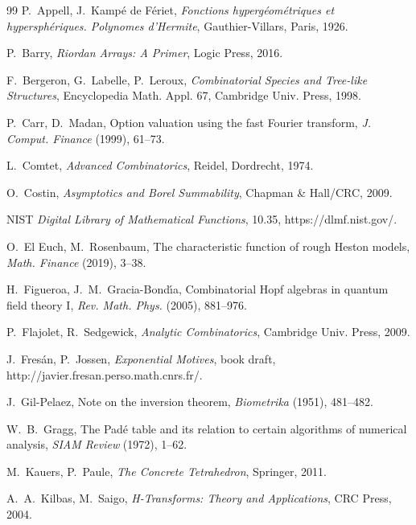 \documentclass{article}
\newcommand{\tmem}[1]{{\em #1\/}}
\newcommand{\tmtextbf}[1]{\text{{\bfseries{#1}}}}
\begin{document}
\begin{thebibliography}{99}
  P.~Appell, J.~Kamp{\'e} de F{\'e}riet, {\tmem{Fonctions
  hyperg{\'e}om{\'e}triques et hypersph{\'e}riques. Polynomes d'Hermite}},
  Gauthier-Villars, Paris, 1926.
  
  P.~Barry, {\tmem{Riordan Arrays: A Primer}}, Logic Press,
  2016.
  
  F.~Bergeron, G.~Labelle, P.~Leroux, {\tmem{Combinatorial
  Species and Tree-like Structures}}, Encyclopedia Math. Appl. 67, Cambridge
  Univ. Press, 1998.
  
  P.~Carr, D.~Madan, Option valuation using the fast
  Fourier transform, {\tmem{J. Comput. Finance}} \tmtextbf{2} (1999), 61--73.
  
  L.~Comtet, {\tmem{Advanced Combinatorics}}, Reidel,
  Dordrecht, 1974.
  
  O.~Costin, {\tmem{Asymptotics and Borel Summability}},
  Chapman \& Hall/CRC, 2009.
  
  NIST {\tmem{Digital Library of Mathematical Functions}},
  {\textsection}10.35, https://dlmf.nist.gov/.

  O.~El Euch, M.~Rosenbaum, The characteristic
  function of rough Heston models, {\tmem{Math. Finance}} \tmtextbf{29}
  (2019), 3--38.
  
  H.~Figueroa, J.~M.~Gracia-Bond{\'\i}a, Combinatorial Hopf
  algebras in quantum field theory I, {\tmem{Rev. Math. Phys.}} \tmtextbf{17}
  (2005), 881--976.
  
  P.~Flajolet, R.~Sedgewick, {\tmem{Analytic Combinatorics}},
  Cambridge Univ. Press, 2009.
  
  J.~Fres{\'a}n, P.~Jossen, {\tmem{Exponential
  Motives}}, book draft, http://javier.fresan.perso.math.cnrs.fr/.
  
  J.~Gil-Pelaez, Note on the inversion theorem,
  {\tmem{Biometrika}} \tmtextbf{38} (1951), 481--482.
  
  W.~B.~Gragg, The Pad{\'e} table and its relation to certain
  algorithms of numerical analysis, {\tmem{SIAM Review}} \tmtextbf{14} (1972),
  1--62.
  
  M.~Kauers, P.~Paule, {\tmem{The Concrete
  Tetrahedron}}, Springer, 2011.
  
  A.~A.~Kilbas, M.~Saigo, {\tmem{H-Transforms: Theory
  and Applications}}, CRC Press, 2004.
  

\end{thebibliography}
\end{document}
